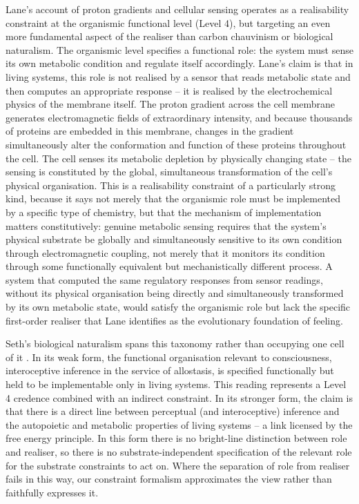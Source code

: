 \documentclass[11pt, a4paper, onecolumn, gdm]{google}
\begin{document}
Lane's account of proton gradients and cellular sensing \citep{lane2022} operates as a realisability constraint at the organismic functional level (Level 4), but targeting an even more fundamental aspect of the realiser than carbon chauvinism or biological naturalism.
The organismic level specifies a functional role: the system must sense its own metabolic condition and regulate itself accordingly.
Lane's claim is that in living systems, this role is not realised by a sensor that reads metabolic state and then computes an appropriate response -- it is realised by the electrochemical physics of the membrane itself.
The proton gradient across the cell membrane generates electromagnetic fields of extraordinary intensity, and because thousands of proteins are embedded in this membrane, changes in the gradient simultaneously alter the conformation and function of these proteins throughout the cell.
The cell senses its metabolic depletion by physically changing state -- the sensing is constituted by the global, simultaneous transformation of the cell's physical organisation.
This is a realisability constraint of a particularly strong kind, because it says not merely that the organismic role must be implemented by a specific type of chemistry, but that the mechanism of implementation matters constitutively: genuine metabolic sensing requires that the system's physical substrate be globally and simultaneously sensitive to its own condition through electromagnetic coupling, not merely that it monitors its condition through some functionally equivalent but mechanistically different process.
A system that computed the same regulatory responses from sensor readings, without its physical organisation being directly and simultaneously transformed by its own metabolic state, would satisfy the organismic role but lack the specific first-order realiser that Lane identifies as the evolutionary foundation of feeling.

Seth's biological naturalism spans this taxonomy rather than occupying one cell of it \citep{seth2024,seth2026stuff}.
In its weak form, the functional organisation relevant to consciousness, interoceptive inference in the service of allostasis, is specified functionally but held to be implementable only in living systems. This reading represents a Level 4 credence combined with an indirect constraint.
In its stronger form, the claim is that there is a direct line between perceptual (and interoceptive) inference and the autopoietic and metabolic properties of living systems -- a link licensed by the free energy principle. In this form there is no bright-line distinction between role and realiser, so there is no substrate-independent specification of the relevant role for the substrate constraints to act on.
Where the separation of role from realiser fails in this way, our constraint formalism approximates the view rather than faithfully expresses it.
\end{document}
